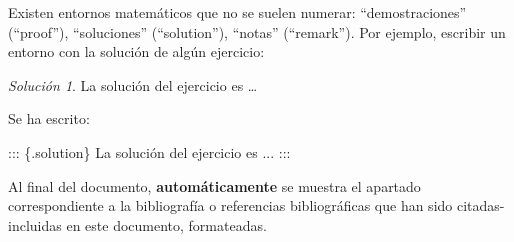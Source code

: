 \documentclass[
  11pt,
  a4paper,
  DIV=11,
  numbers=noendperiod]{scrartcl}
\newenvironment{Shaded}{\begin{snugshade}}{\end{snugshade}}
\newcommand{\NormalTok}[1]{\textcolor[rgb]{0.00,0.23,0.31}{#1}}
\theoremstyle{definition}
\theoremstyle{remark}
\newtheorem*{solution}{Solución}
\begin{document}
Existen entornos matemáticos que no se suelen numerar:
``demostraciones'' (``proof''), ``soluciones'' (``solution''), ``notas''
(``remark''). Por ejemplo, escribir un entorno con la solución de algún
ejercicio:

\begin{solution}
La solución del ejercicio es \ldots{}
\end{solution}

Se ha escrito:

\begin{Shaded}
\begin{Highlighting}[]
\NormalTok{::: \{.solution\}}
\NormalTok{La solución del ejercicio es ...}
\NormalTok{:::}
\end{Highlighting}
\end{Shaded}

\begin{tcolorbox}[enhanced jigsaw, rightrule=.15mm, toprule=.15mm, opacitybacktitle=0.6, arc=.35mm, toptitle=1mm, left=2mm, colback=white, colbacktitle=quarto-callout-note-color!10!white, opacityback=0, colframe=quarto-callout-note-color-frame, breakable, coltitle=black, bottomtitle=1mm, titlerule=0mm, title=\textcolor{quarto-callout-note-color}{\faInfo}\hspace{0.5em}{Nota}, bottomrule=.15mm, leftrule=.75mm]

Al final del documento, \textbf{automáticamente} se muestra el apartado
correspondiente a la bibliografía o referencias bibliográficas que han
sido citadas-incluidas en este documento, formateadas.

\end{tcolorbox}


  
\end{document}
